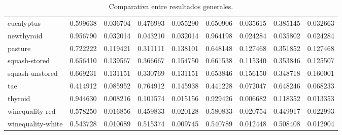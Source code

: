 \begin{table}
\begin{tabular}{l|r|r|r|r|r|r|r|r}
				eucalyptus & \cellcolor{myred} 0.599638 & 0.036704 & \cellcolor{myred} 0.476993 & 0.055290 & \cellcolor{mygreen} 0.650906 & 0.035615 & \cellcolor{mygreen} 0.385145 & 0.032663\\ 
				newthyroid & \cellcolor{myred} 0.956790 & 0.032014 & \cellcolor{myred} 0.043210 & 0.032014 & \cellcolor{mygreen} 0.964198 & 0.024284 & \cellcolor{mygreen} 0.035802 & 0.024284\\ 
				pasture & \cellcolor{mygreen} 0.722222 & 0.119421 & \cellcolor{mygreen} 0.311111 & 0.138101 & \cellcolor{myred} 0.648148 & 0.127468 & \cellcolor{myred} 0.351852 & 0.127468\\ 
				squash-stored & \cellcolor{myred} 0.656410 & 0.139567 & \cellcolor{myred} 0.366667 & 0.154750 & \cellcolor{mygreen} 0.661538 & 0.115340 & \cellcolor{mygreen} 0.353846 & 0.125507\\ 
				squash-unstored & \cellcolor{mygreen} 0.669231 & 0.131151 & \cellcolor{mygreen} 0.330769 & 0.131151 & \cellcolor{myred} 0.653846 & 0.156150 & \cellcolor{myred} 0.348718 & 0.160001\\ 
				tae & \cellcolor{myred} 0.414912 & 0.085952 & \cellcolor{myred} 0.764912 & 0.145938 & \cellcolor{mygreen} 0.441228 & 0.072047 & \cellcolor{mygreen} 0.648246 & 0.068233\\ 
				thyroid & \cellcolor{mygreen} 0.944630 & 0.008216 & \cellcolor{mygreen} 0.101574 & 0.015156 & \cellcolor{myred} 0.929426 & 0.006682 & \cellcolor{myred} 0.118352 & 0.013353\\ 
				winequality-red & \cellcolor{myred} 0.578250 & 0.016856 & \cellcolor{myred} 0.459833 & 0.020128 & \cellcolor{mygreen} 0.580833 & 0.020754 & \cellcolor{mygreen} 0.449917 & 0.022993\\ 
				winequality-white & \cellcolor{mygreen} 0.543728 & 0.010689 & \cellcolor{myred} 0.515374 & 0.009745 & \cellcolor{myred} 0.540789 & 0.012448 & \cellcolor{mygreen} 0.508408 & 0.012904\\
				\hline
			\end{tabular}
			\caption{Comparativa entre resultados generales.}
			\label{tab:comp}
		\end{table}
